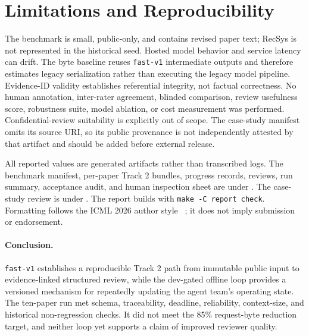 \documentclass{article}
\begin{document}
\section{Limitations and Reproducibility}

The benchmark is small, public-only, and contains revised paper text; RecSys is
not represented in the historical seed. Hosted model behavior and service
latency can drift. The byte baseline reuses \texttt{fast-v1} intermediate
outputs and therefore estimates legacy serialization rather than executing the
legacy model pipeline. Evidence-ID validity establishes referential integrity,
not factual correctness. No human annotation, inter-rater agreement, blinded
comparison, review usefulness score, robustness suite, model ablation, or cost
measurement was performed. Confidential-review suitability is explicitly out
of scope. The case-study manifest omits its source URI, so its public
provenance is not independently attested by that artifact and should be added
before external release.

All reported values are generated artifacts rather than transcribed logs. The
benchmark manifest, per-paper Track 2 bundles, progress records, reviews, run
summary, acceptance audit, and human inspection sheet are under
. The case-study review is
under . The report builds with
\texttt{make -C report check}. Formatting follows the ICML 2026 author style
~\cite{icml2026author}; it does not imply submission or endorsement.

\paragraph{Conclusion.}
\texttt{fast-v1} establishes a reproducible Track 2 path from immutable public
input to evidence-linked structured review, while the dev-gated offline loop
provides a versioned mechanism for repeatedly updating the agent team's
operating state. The ten-paper run met schema, traceability, deadline,
reliability, context-size, and historical non-regression checks. It did not
meet the 85\% request-byte reduction target, and neither loop yet supports a
claim of improved reviewer quality.

\clearpage


\end{document}
